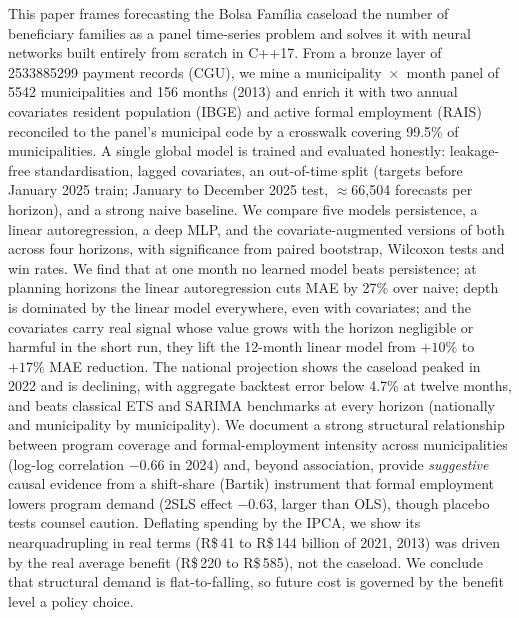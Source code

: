 \documentclass[12pt,a4paper,oneside]{article}
\begin{document}
\noindent
This paper frames forecasting the Bolsa Família caseload \textemdash{}
the number of beneficiary families \textemdash{} as a panel time-series
problem and solves it with neural networks built entirely from scratch in
C++17. From a bronze layer of \num{2533885299} payment records (CGU), we
mine a municipality~$\times$~month panel of \num{5542} municipalities and
156 months (2013) and enrich it with two annual
covariates \textemdash{} resident population (IBGE) and active formal
employment (RAIS) \textemdash{} reconciled to the panel's municipal code
by a crosswalk covering 99.5\% of municipalities. A single global model is
trained and evaluated honestly: leakage-free standardisation, lagged
covariates, an out-of-time split (targets before January 2025 train;
January to December 2025 test, $\approx$66{,}504 forecasts per horizon),
and a strong naive baseline. We compare five models \textemdash{}
persistence, a linear autoregression, a deep MLP, and the
covariate-augmented versions of both \textemdash{} across four horizons,
with significance from paired bootstrap, Wilcoxon tests and win rates. We
find that at one month no learned model beats persistence; at planning
horizons the linear autoregression cuts MAE by 27\% over naive; depth is
dominated by the linear model everywhere, even with covariates; and the
covariates carry real signal whose value grows with the horizon \textemdash{}
negligible or harmful in the short run, they lift the 12-month linear model
from $+10\%$ to $+17\%$ MAE reduction. The national projection shows the
caseload peaked in 2022 and is declining, with aggregate
backtest error below 4.7\% at twelve months, and beats classical ETS and
SARIMA benchmarks at every horizon (nationally and municipality by
municipality). We document a strong structural relationship between program
coverage and formal-employment intensity across municipalities (log-log
correlation $-0.66$ in 2024) and, beyond association, provide
\emph{suggestive} causal evidence from a shift-share (Bartik) instrument
that formal employment lowers program demand (2SLS effect $-0.63$, larger
than OLS), though placebo tests counsel caution. Deflating spending by the
IPCA, we show its near\-quadrupling in real terms (R\$\,41 to R\$\,144
billion of 2021, 2013) was driven by the real average
benefit (R\$\,220 to R\$\,585), not the caseload. We conclude that
structural demand is flat-to-falling, so future cost is governed by the
benefit level \textemdash{} a policy choice.

\medskip
\end{document}
